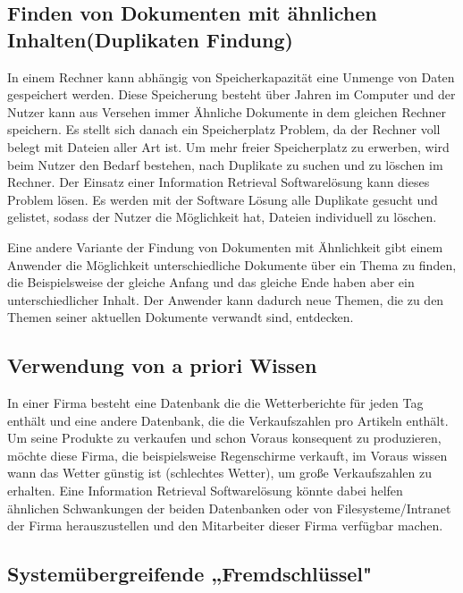 \subsection{Finden von Dokumenten mit ähnlichen Inhalten(Duplikaten Findung)}
\label{subsec:Duplikatenfindung}

In einem Rechner kann abhängig von Speicherkapazität eine Unmenge von Daten gespeichert werden. Diese Speicherung besteht über Jahren im Computer und der Nutzer kann aus Versehen immer Ähnliche Dokumente in dem gleichen Rechner speichern. Es stellt sich danach ein Speicherplatz Problem, da der Rechner voll belegt mit Dateien aller Art ist. Um mehr freier Speicherplatz zu erwerben, wird beim Nutzer den Bedarf bestehen, nach Duplikate zu suchen und zu löschen im Rechner. Der Einsatz einer Information Retrieval Softwarelösung kann dieses Problem lösen. Es werden mit der Software Lösung alle Duplikate gesucht und gelistet, sodass der Nutzer die Möglichkeit hat, Dateien individuell zu löschen. 

Eine andere Variante der Findung von Dokumenten mit Ähnlichkeit gibt einem Anwender die Möglichkeit unterschiedliche Dokumente über ein Thema zu finden, die Beispielsweise der gleiche Anfang und das gleiche Ende haben aber ein unterschiedlicher Inhalt. Der Anwender kann dadurch neue Themen, die zu den Themen seiner aktuellen Dokumente verwandt sind, entdecken.


\subsection{Verwendung von a priori Wissen}
\label{subsec:Verwendungaprioriwissen}

In einer Firma besteht eine Datenbank die die Wetterberichte für jeden Tag enthält und eine andere Datenbank, die die Verkaufszahlen pro Artikeln enthält. Um seine Produkte zu verkaufen und schon Voraus konsequent zu produzieren, möchte diese Firma, die beispielsweise Regenschirme verkauft, im Voraus wissen wann das Wetter günstig ist (schlechtes Wetter), um große Verkaufszahlen zu erhalten. Eine Information Retrieval Softwarelösung könnte dabei helfen ähnlichen Schwankungen der beiden Datenbanken oder von Filesysteme/Intranet der Firma herauszustellen und den Mitarbeiter dieser Firma verfügbar machen.

\subsection{Systemübergreifende „Fremdschlüssel"}
\label{subsec:SystemFK}


